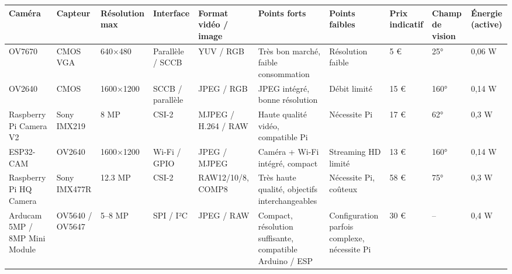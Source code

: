 \begin{landscape}
    \begin{table}[!ht]
        \centering
        \begin{tabularx}{\textwidth}{
            |p{3cm}|p{2.5cm}|p{2.5cm}|p{2cm}|
            p{2.5cm}|p{3cm}|p{3cm}|p{1.5cm}|p{2cm}|p{2cm}|
            }
            \hline
            \textbf{Caméra}               & \textbf{Capteur}         & \textbf{Résolution max}   & \textbf{Interface} &
            \textbf{Format vidéo / image} & \textbf{Points forts}    & \textbf{Points faibles}   &
            \textbf{Prix indicatif}       & \textbf{Champ de vision} & \textbf{Énergie (active)}                                                                                                                                                                             \\
            \hline
            OV7670                        & CMOS VGA                 & 640×480                   & Parallèle / SCCB   & YUV / RGB           & Très bon marché, faible consommation                     & Résolution faible                            & 5 €  & 25°  & 0,06 W \\
            \hline
            OV2640                        & CMOS                     & 1600×1200                 & SCCB / parallèle   & JPEG / RGB          & JPEG intégré, bonne résolution                           & Débit limité                                 & 15 € & 160° & 0,14 W \\
            \hline
            Raspberry Pi Camera V2        & Sony IMX219              & 8 MP                      & CSI-2              & MJPEG / H.264 / RAW & Haute qualité vidéo, compatible Pi                       & Nécessite Pi                                 & 17 € & 62°  & 0,3 W  \\
            \hline
            ESP32-CAM                     & OV2640                   & 1600×1200                 & Wi-Fi / GPIO       & JPEG / MJPEG        & Caméra + Wi-Fi intégré, compact                          & Streaming HD limité                          & 13 € & 160° & 0,14 W \\
            \hline
            Raspberry Pi HQ Camera        & Sony IMX477R             & 12.3 MP                   & CSI-2              & RAW12/10/8, COMP8   & Très haute qualité, objectifs interchangeables           & Nécessite Pi, coûteux                        & 58 € & 75°  & 0,3 W  \\
            \hline
            Arducam 5MP / 8MP Mini Module & OV5640 / OV5647          & 5–8 MP                    & SPI / I²C          & JPEG / RAW          & Compact, résolution suffisante, compatible Arduino / ESP & Configuration parfois complexe, nécessite Pi & 30 € & --   & 0,4 W  \\

\end{tabularx}
\end{table}
\end{landscape}
